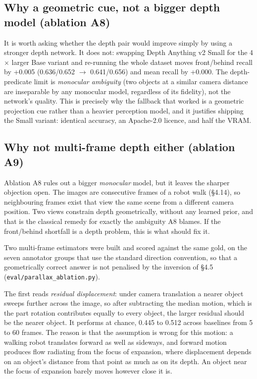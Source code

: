 \subsection{Why a geometric cue, not a bigger depth model (ablation A8)}

It is worth asking whether the depth pair would improve simply by using a stronger depth network. It does not: swapping Depth Anything v2 Small for the 4$\times$ larger Base variant and re-running the whole dataset moves front/behind recall by +0.005 (0.636/0.652 $\rightarrow$ 0.641/0.656) and mean recall by +0.000. The depth-predicate limit is \textit{monocular ambiguity} (two objects at a similar camera distance are inseparable by any monocular model, regardless of its fidelity), not the network's quality. This is precisely why the fallback that worked is a geometric projection cue rather than a heavier perception model, and it justifies shipping the Small variant: identical accuracy, an Apache-2.0 licence, and half the VRAM.


\subsection{Why not multi-frame depth either (ablation A9)}

Ablation A8 rules out a bigger \textit{monocular} model, but it leaves the sharper objection open. The images are consecutive frames of a robot walk (\S4.14), so neighbouring frames exist that view the same scene from a different camera position. Two views constrain depth geometrically, without any learned prior, and that is the classical remedy for exactly the ambiguity A8 blames. If the front/behind shortfall is a depth problem, this is what should fix it.

Two multi-frame estimators were built and scored against the same gold, on the seven annotator groups that use the standard direction convention, so that a geometrically correct answer is not penalised by the inversion of \S4.5 (\texttt{eval/parallax\_ablation.py}).

The first reads \textit{residual displacement}: under camera translation a nearer object sweeps further across the image, so after subtracting the median motion, which is the part rotation contributes equally to every object, the larger residual should be the nearer object. It performs at chance, 0.445 to 0.512 across baselines from 5 to 60 frames. The reason is that the assumption is wrong for this motion: a walking robot translates forward as well as sideways, and forward motion produces flow radiating from the focus of expansion, where displacement depends on an object's distance from that point as much as on its depth. An object near the focus of expansion barely moves however close it is.

